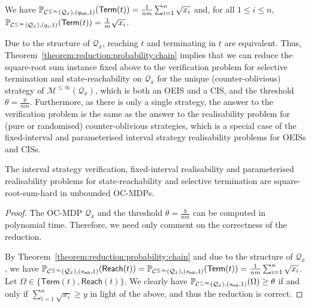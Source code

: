 \documentclass[a4paper,UKenglish,cleveref,autoref,thm-restate,colorlinks]{lipics-v2021}
\newcommand{\init}{\mathsf{init}}
\newcommand{\sqsx}{x} \newcommand{\sqsxVect}{\bar{x}} \newcommand{\sqsm}{m} \newcommand{\sqsy}{y} \newcommand{\sqsi}{i} \newcommand{\sqsn}{n} \newcommand{\sqsSize}{E}
\newcommand{\mdp}{\mathcal{M}}
\newcommand{\ocmdp}{\mathcal{Q}}
\newcommand{\ocmdpFin}[2]{\mdp^{\leq #2}(#1)}
\newcommand{\ocState}{q}
\newcommand{\ocStateC}{t}
\newcommand{\ocConfig}{s}
\newcommand{\mchain}{\mathcal{C}}
\newcommand{\ocChainFin}[2]{\mchain^{\leq #2}(#1)}
\newcommand{\chainX}{\ocmdp_{\sqsxVect}}
\newcommand{\objective}{\Omega}
\newcommand{\reach}[1]{\mathsf{Reach}(#1)}
\newcommand{\termination}{\mathsf{Term}}
\newcommand{\selectiveTermination}[1]{\termination({#1})}
\newcommand{\thresProba}{\theta}
\begin{document}
  \begin{theorem}\label{theorem:reduction:probability:chain}
    We have $\probaMCverb{\ocChainFin{\chainX}{\infty}}{(\ocState_\init, 1)}(\selectiveTermination{\ocStateC}) = \frac{1}{\sqsn\sqsm}\sum_{\sqsi=1}^\sqsn\sqrt{\sqsx_\sqsi}$ and, for all $1\leq\sqsi\leq\sqsn$, $\probaMCverb{\ocChainFin{\chainX}{\infty}}{(\ocState_\sqsi, 1)}(\selectiveTermination{\ocStateC}) = \frac{1}{\sqsm}\sqrt{\sqsx_\sqsi}$.
\end{theorem}

Due to the structure of $\chainX$, reaching $\ocStateC$ and terminating in $\ocStateC$ are equivalent.
Thus, Theorem~\ref{theorem:reduction:probability:chain} implies that we can reduce the square-root sum instance fixed above to the verification problem for selective termination and state-reachability on $\chainX$ for the unique (counter-oblivious) strategy of $\ocmdpFin{\chainX}{\infty}$, which is both an OEIS and a CIS, and the threshold $\thresProba=\frac{\sqsy}{\sqsn\sqsm}$.
Furthermore, as there is only a single strategy, the answer to the verification problem is the same as the answer to the realisability problem for (pure or randomised) counter-oblivious strategies, which is a special case of the fixed-interval and parameterised interval strategy realisability problems for OEISs and CISs.

\begin{theorem}\label{verification:hardness:unbounded}
  The interval strategy verification, fixed-interval realisability and parameterised realisability problems for state-reachability and selective termination are square-root-sum-hard in unbounded OC-MDPs.
\end{theorem}
\begin{proof}
  The OC-MDP $\chainX$ and the threshold $\thresProba = \frac{\sqsy}{\sqsn\sqsm}$ can be computed in polynomial time.
  Therefore, we need only comment on the correctness of the reduction.
  
  By Theorem~\ref{theorem:reduction:probability:chain} and due to the structure of $\chainX$, we have $\probaMCverb{\ocChainFin{\chainX}{\infty}}{(\ocConfig_\init, 1)}(\reach{\ocStateC}) = \probaMCverb{\ocChainFin{\chainX}{\infty}}{(\ocConfig_\init, 1)}(\selectiveTermination{\ocStateC}) = \frac{1}{\sqsn\sqsm}\sum_{\sqsi=1}^\sqsn\sqrt{\sqsx_\sqsi}$.
  Let $\objective\in\{\selectiveTermination{\ocStateC}, \reach{\ocStateC}\}$.
  We clearly have $\probaMCverb{\ocChainFin{\chainX}{\infty}}{(\ocConfig_\init, 1)}(\objective)\geq\thresProba$ if and only if $\sum_{\sqsi=1}^\sqsn\sqrt{\sqsx_\sqsi}\geq\sqsy$ in light of the above, and thus the reduction is correct.
\end{proof}
\end{document}
